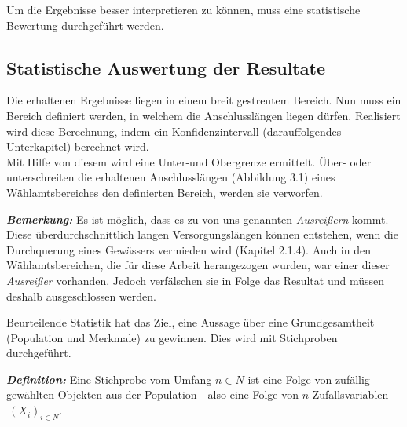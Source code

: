 Um die Ergebnisse besser interpretieren zu können, muss eine statistische Bewertung durchgeführt werden. 

\subsection{Statistische Auswertung der Resultate}
\label{sec:3 ergebnisse}

\vspace{0.3cm}

Die erhaltenen Ergebnisse liegen in einem breit gestreutem Bereich. 
Nun muss ein Bereich definiert werden, in welchem die Anschlusslängen liegen dürfen.
Realisiert wird diese Berechnung, indem ein Konfidenzintervall (darauffolgendes Unterkapitel) berechnet wird.\\
Mit Hilfe von diesem wird eine Unter-und Obergrenze ermittelt. Über- oder unterschreiten die erhaltenen Anschlusslängen (Abbildung 3.1) eines
Wählamtsbereiches den definierten Bereich, werden sie verworfen.

\vspace{0.5cm}

\begin{graybox}
\textbf{\textit{Bemerkung:}} Es ist möglich, dass es zu von uns genannten \textit{Ausreißern} kommt. 
Diese überdurchschnittlich langen Versorgungslängen können entstehen, wenn die Durchquerung eines Gewässers vermieden wird (Kapitel 2.1.4). 
Auch in den Wählamtsbereichen, die für diese Arbeit herangezogen wurden, war einer dieser \textit{Ausreißer} vorhanden.   
Jedoch verfälschen sie in Folge das Resultat und  müssen deshalb ausgeschlossen werden.
\end{graybox}

\vspace{0.5cm}

Beurteilende Statistik hat das Ziel, eine Aussage über eine Grundgesamtheit (Population und Merkmale) zu gewinnen. Dies wird mit Stichproben durchgeführt.   

\vspace{0.5cm}

\begin{graybox}
\textbf{\textit{Definition:}} Eine Stichprobe vom Umfang $n \in N$ ist eine Folge von zufällig gewählten Objekten aus der Population - also eine Folge
von $n$ Zufallsvariablen$~(X_{i})_{i \in N}$\cite{bachhiesl2}.
\end{graybox}

\vspace{1cm}


